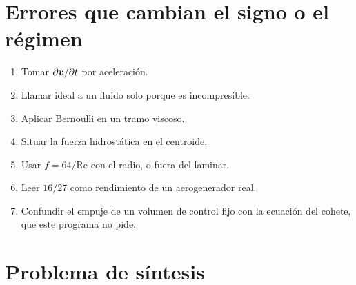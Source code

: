 \section{Errores que cambian el signo o el régimen}

\begin{enumerate}[leftmargin=1.4em]
\item Tomar \(\partial\boldsymbol{v}/\partial t\) por aceleración.
\item Llamar ideal a un fluido solo porque es incompresible.
\item Aplicar Bernoulli en un tramo viscoso.
\item Situar la fuerza hidrostática en el centroide.
\item Usar \(f=64/\mathrm{Re}\) con el radio, o fuera del laminar.
\item Leer \(16/27\) como rendimiento de un aerogenerador real.
\item Confundir el empuje de un volumen de control fijo con la ecuación del cohete, que este programa no pide.
\end{enumerate}

\section{Problema de síntesis}

